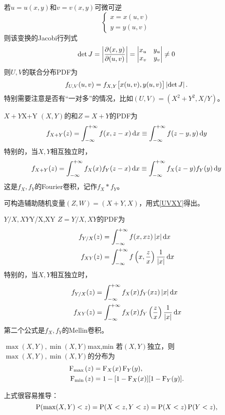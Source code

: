 若$u=u(x,y)$和$v=v(x,y)$可微可逆
\[
	\begin{cases}
		x=x(u,v)\\
		y=y(u,v)
	\end{cases}
\]
则该变换的Jacobi行列式
\[
	\det J=\abs{\pv{(x,y)}{(u,v)}}=\begin{vmatrix}
		x_u&y_u\\x_v&y_v
	\end{vmatrix}\neq 0
\]
则$U,V$的联合分布PDF为
\begin{align}\label{UVXY}
	f_{U,V}(u,v)=f_{X,Y}\bigfkh{x(u,v),y(u,v)}\abs{\det J}.
\end{align}
特别需要注意是否有“一对多”的情况，比如$(U,V)=(X^2+Y^2,X/Y)$。
\begin{example}{$X+Y$}{X+Y}
	$(X,Y)$的和$Z=X+Y$的PDF为
	\begin{align}
		f_{X+Y}(z)=\int\iti f(x,z-x)\d x\equiv\int\iti f(z-y,y)\d y
	\end{align}
	特别的，当$X,Y$相互独立时，%
	\[
		f_{X+Y}(z)=\int\iti f_X(x)f_Y(z-x)\d x\equiv\int\iti f_X(z-y)f_Y(y)\d y
	\]
	这是$f_X,f_Y$的Fourier卷积，记作$f_X\ast f_Y$。
\end{example}
可构造辅助随机变量$(Z,W)=(X+Y,X)$，用式\eqref{UVXY}得出。
\begin{example}{$Y/X,XY$}{Y/X,XY}
	$Z=Y/X,XY$的PDF为
	\begin{align}
		f_{Y/X}(z)&=\int\iti f(x,xz)\abs x\d x\\
		f_{XY}(z)&=\int\iti f\kh{x,\frac zx}\frac1{\abs{x}}\d x
	\end{align}
	特别的，当$X,Y$相互独立时，
	\begin{align*}
		f_{Y/X}(z)&=\int\iti f_X(x)f_Y(xz)\abs x\d x\\
		f_{XY}(z)&=\int\iti f_X(x)f_Y\kh{\frac zx}\frac1{\abs x}\d x
	\end{align*}
	第二个公式是$f_X,f_Y$的Mellin卷积。
\end{example}
\begin{example}{$\max(X,Y),\min(X,Y)$}{max,min}
	若$(X,Y)$独立，则$\max(X,Y),\min(X,Y)$的分布为
	\begin{align}
		\CDF_{\max{}}(z)&=\CDF_X(x)\CDF_Y(y),\\
		\CDF_{\min{}}(z)&=1-[1-\CDF_X(x)][1-\CDF_Y(y)].
	\end{align}
\end{example}
上式很容易推导：
\[
	\P(\max(X,Y)<z)=\P(X<z,Y<z)=\P(X<z)\P(Y<z),
\]
